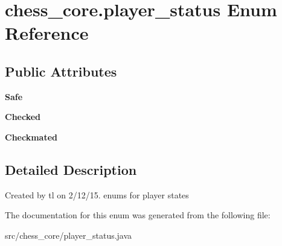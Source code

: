 \hypertarget{enumchess__core_1_1player__status}{}\section{chess\+\_\+core.\+player\+\_\+status Enum Reference}
\label{enumchess__core_1_1player__status}
\subsection*{Public Attributes}
\begin{DoxyCompactItemize}
\item 
\hypertarget{enumchess__core_1_1player__status_a37022bc4f450aa36df0b3fd9c4f15ca3}{}{\bfseries Safe}\label{enumchess__core_1_1player__status_a37022bc4f450aa36df0b3fd9c4f15ca3}

\item 
\hypertarget{enumchess__core_1_1player__status_a24548feb398c78cc6f423db107c7c163}{}{\bfseries Checked}\label{enumchess__core_1_1player__status_a24548feb398c78cc6f423db107c7c163}

\item 
\hypertarget{enumchess__core_1_1player__status_a1d67d09c9e2ab01b4efa2c50b9407df1}{}{\bfseries Checkmated}\label{enumchess__core_1_1player__status_a1d67d09c9e2ab01b4efa2c50b9407df1}

\end{DoxyCompactItemize}


\subsection{Detailed Description}
Created by tl on 2/12/15. enums for player states 

The documentation for this enum was generated from the following file\+:\begin{DoxyCompactItemize}
\item 
src/chess\+\_\+core/player\+\_\+status.\+java\end{DoxyCompactItemize}
